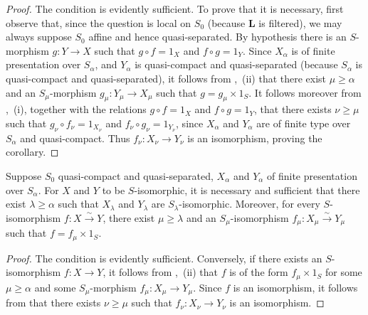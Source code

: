 \begin{proof}
The condition is evidently sufficient. To prove that it is necessary, first observe that, since the question is local on $S_0$ (because $\mathbf{L}$ is filtered), we may always suppose $S_0$ affine and hence quasi-separated. By hypothesis there is an $S$-morphism $g:Y\to X$ such that $g\circ f=1_X$ and $f\circ g=1_Y$. Since $X_\alpha$ is of finite presentation over $S_\alpha$, and $Y_\alpha$ is quasi-compact and quasi-separated (because $S_\alpha$ is quasi-compact and quasi-separated), it follows from ,~(ii) that there exist $\mu\geqslant\alpha$ and an $S_\mu$-morphism $g_\mu:Y_\mu\to X_\mu$ such that $g=g_\mu\times 1_S$. It follows moreover from ,~(i), together with the relations $g\circ f=1_X$ and $f\circ g=1_Y$, that there exists $\nu\geqslant\mu$ such that $g_\nu\circ f_\nu=1_{X_\nu}$ and $f_\nu\circ g_\nu=1_{Y_\nu}$, since $X_\alpha$ and $Y_\alpha$ are of finite type over $S_\alpha$ and quasi-compact. Thus $f_\nu:X_\nu\to Y_\nu$ is an isomorphism, proving the corollary.
\end{proof}

\begin{corollary}[8.8.2.5]
\label{IV.8.8.2.5}
Suppose $S_0$ quasi-compact and quasi-separated, $X_\alpha$ and $Y_\alpha$ of finite presentation over $S_\alpha$.
For $X$ and $Y$ to be $S$-isomorphic, it is necessary and sufficient that there exist $\lambda\geqslant\alpha$ such that $X_\lambda$ and $Y_\lambda$ are $S_\lambda$-isomorphic. Moreover, for every $S$-isomorphism $f:X\xrightarrow{\sim}Y$, there exist $\mu\geqslant\lambda$ and an $S_\mu$-isomorphism $f_\mu:X_\mu\xrightarrow{\sim}Y_\mu$ such that $f=f_\mu\times 1_S$.
\end{corollary}

\begin{proof}
The condition is evidently sufficient. Conversely, if there exists an $S$-isomorphism $f:X\to Y$, it follows from ,~(ii) that $f$ is of the form $f_\mu\times 1_S$ for some $\mu\geqslant\alpha$ and some $S_\mu$-morphism $f_\mu:X_\mu\to Y_\mu$. Since $f$ is an isomorphism, it follows from  that there exists $\nu\geqslant\mu$ such that $f_\nu:X_\nu\to Y_\nu$ is an isomorphism.
\end{proof}

